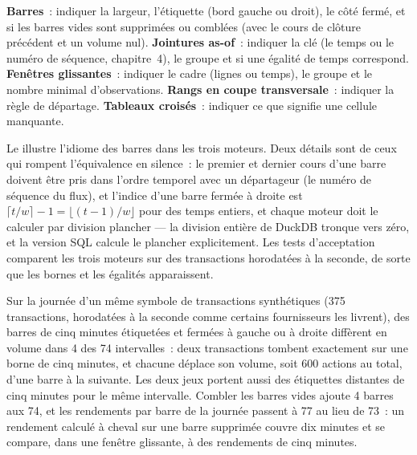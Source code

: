 \begin{method}\label{met:pl:dataframes:idioms}
\textbf{Barres}~: indiquer la largeur, l'étiquette (bord gauche ou droit), le côté fermé, et si les barres vides sont supprimées ou comblées (avec
le cours de clôture précédent et un volume nul). \textbf{Jointures as-of}~: indiquer la clé (le temps ou le numéro de séquence, chapitre~4), le groupe et si
une égalité de temps correspond. \textbf{Fenêtres glissantes}~: indiquer le cadre (lignes ou temps), le groupe et le nombre minimal d'observations.
\textbf{Rangs en coupe transversale}~: indiquer la règle de départage. \textbf{Tableaux croisés}~: indiquer ce que signifie une cellule manquante.
\end{method}

\label{lst:pl:dataframes:bars}

Le  illustre l'idiome des barres dans les trois moteurs. Deux détails sont de ceux qui rompent l'équivalence en silence~: le
premier et dernier cours d'une barre doivent être pris dans l'ordre temporel avec un départageur (le numéro de séquence du flux), et l'indice d'une
barre fermée à droite est $\lceil t/w \rceil - 1 = \lfloor (t-1)/w \rfloor$ pour des temps entiers, et chaque moteur doit le calculer par division plancher
--- la division entière de DuckDB tronque vers zéro, et la version SQL calcule le plancher explicitement. Les tests d'acceptation
comparent les trois moteurs sur des transactions horodatées à la seconde, de sorte que les bornes et les égalités apparaissent.

\begin{example}\label{ex:pl:dataframes:bars}
Sur la journée d'un même symbole de transactions synthétiques (375 transactions, horodatées à la seconde comme certains fournisseurs les livrent), des barres de cinq minutes étiquetées
et fermées à gauche ou à droite diffèrent en volume dans 4 des 74 intervalles~: deux transactions tombent exactement sur une borne de cinq minutes,
et chacune déplace son volume, soit 600 actions au total, d'une barre à la suivante. Les deux jeux portent aussi des étiquettes distantes de cinq minutes pour le même
intervalle. Combler les barres vides ajoute 4 barres aux 74, et les rendements par barre de la journée passent à 77 au lieu de 73~: un rendement calculé à cheval sur une
barre supprimée couvre dix minutes et se compare, dans une fenêtre glissante, à des rendements de cinq minutes.
\end{example}


